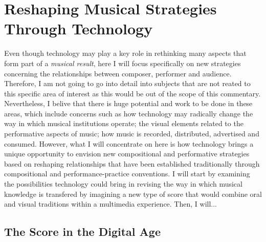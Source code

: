 \section{Reshaping Musical Strategies Through Technology}

Even though technology may play a key role in rethinking many aspects that form part of a \emph{musical result}, here I will focus specifically on new strategies concerning the relationships between composer, performer and audience. Therefore, I am not going to go into detail into subjects that are not reated to this specific area of interest as this would be out of the scope of this commentary. Nevertheless, I belive that there is huge potential and work to be done in these areas, which include concerns such as how technology may radically change the way in which musical institutions operate; the visual elements related to the performative aspects of music; how music is recorded, distributed, advertised and consumed. However, what I will concentrate on here is how technology brings a unique opportunity to envision new compositional and performative strategies based on reshaping relationships that have been established traditionally through compositional and performance-practice conventions. I will start by examining the possibilities technology could bring in revising the way in which musical knowledge is transfered by imagining a new type of score that would combine oral and visual traditions within a multimedia experience. Then, I will...

\subsection{The Score in the Digital Age}

